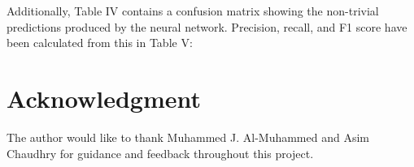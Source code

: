 \documentclass[journal]{IEEEtran}
\begin{document}
Additionally, Table IV contains a confusion matrix showing the non-trivial predictions produced by the neural network. Precision, recall, and F1 score have been calculated from this in Table V: 

\begin{table}[H]
\centering
{\fontsize{14}{16}\selectfont
{}}
\caption{Confusion Matrix — UCI Thyroid Dataset Classification Results}
\end{table}

\begin{table}[H]
\centering
{\fontsize{14}{16}\selectfont
{}}
\caption{Per-Class and Aggregate Classification Metrics — UCI Thyroid Dataset}
\end{table}

\section{Acknowledgment}
The author would like to thank Muhammed J. Al-Muhammed and Asim Chaudhry for guidance and feedback throughout this project.
\end{document}
